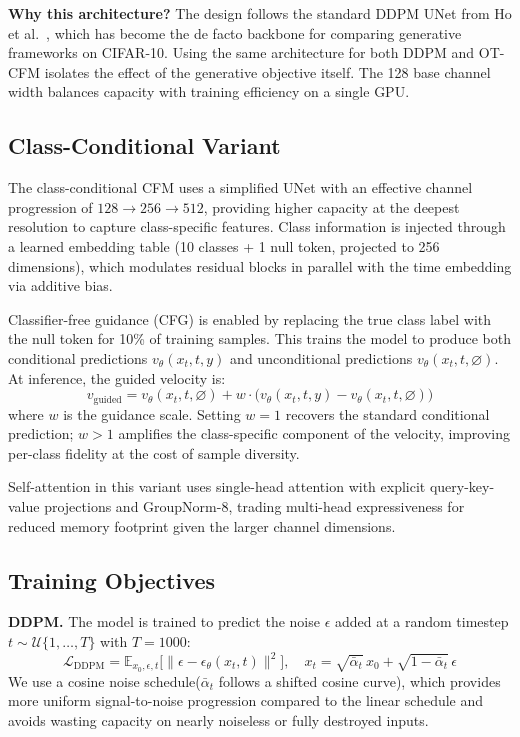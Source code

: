 \documentclass[10pt]{article}
\begin{document}
  \textbf{Why this architecture?} The design follows the standard DDPM UNet from Ho et al.~\cite{ho2020denoising}, which has become the de facto backbone for comparing generative frameworks on
  CIFAR-10. Using the same architecture for both DDPM and OT-CFM isolates the effect of the generative objective itself. The 128 base channel width balances capacity with training efficiency on a
  single GPU.

  \subsection{Class-Conditional Variant}

  The class-conditional CFM uses a simplified UNet with an effective channel progression of $128{\rightarrow}256{\rightarrow}512$, providing higher capacity at the deepest resolution to capture
  class-specific features. Class information is injected through a learned embedding table (10 classes + 1 null token, projected to 256 dimensions), which modulates residual blocks in parallel with
  the time embedding via additive bias.

  Classifier-free guidance (CFG) is enabled by replacing the true class label with the null token for 10\% of training samples. This trains the model to produce both
  conditional predictions $v_\theta(x_t, t, y)$ and unconditional predictions $v_\theta(x_t, t, \varnothing)$. At inference, the guided velocity is:
  \begin{equation}
      v_{\text{guided}} = v_\theta(x_t, t, \varnothing) + w \cdot \bigl(v_\theta(x_t, t, y) - v_\theta(x_t, t, \varnothing)\bigr)
  \end{equation}
  where $w$ is the guidance scale. Setting $w{=}1$ recovers the standard conditional prediction; $w{>}1$ amplifies the class-specific component of the velocity, improving per-class fidelity at the
  cost of sample diversity.

  Self-attention in this variant uses single-head attention with explicit query-key-value projections and GroupNorm-8, trading multi-head expressiveness for reduced memory footprint given the larger
   channel dimensions.

  \subsection{Training Objectives}

  \textbf{DDPM.} The model is trained to predict the noise $\epsilon$ added at a random timestep $t \sim \mathcal{U}\{1, \ldots, T\}$ with $T{=}1000$:
  \begin{equation}
      \mathcal{L}_{\text{DDPM}} = \mathbb{E}_{x_0, \epsilon, t}\bigl[\| \epsilon - \epsilon_\theta(x_t, t) \|^2\bigr], \quad x_t = \sqrt{\bar\alpha_t}\, x_0 + \sqrt{1 - \bar\alpha_t}\, \epsilon
  \end{equation}
  We use a cosine noise schedule($\bar\alpha_t$ follows a shifted cosine curve), which provides more uniform signal-to-noise progression compared to the linear schedule
  and avoids wasting capacity on nearly noiseless or fully destroyed inputs.
\end{document}
